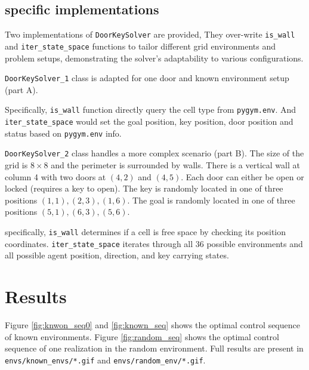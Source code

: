 \documentclass[conference]{IEEEtran}
\begin{document}
\subsection{specific implementations}
Two implementations of \texttt{DoorKeySolver} are provided, 
They over-write \texttt{is\_wall} and \texttt{iter\_state\_space} functions
to tailor different grid environments and problem setups, 
demonstrating the solver's adaptability to various configurations. 

\texttt{DoorKeySolver\_1} class 
is adapted for one door and known environment setup (part A).

Specifically, \texttt{is\_wall} function directly query the cell type from \texttt{pygym.env}.
And \texttt{iter\_state\_space} would set the goal position, key position, door position and status
based on \texttt{pygym.env} info.

\texttt{DoorKeySolver\_2} class handles a more complex scenario (part B).
The size of the grid is $8 \times 8$ and the perimeter is surrounded by walls. 
There is a vertical wall at column 4 with two doors at $(4, 2)$ and $(4, 5)$. 
Each door can either be open or locked (requires a key to open). 
The key is randomly located in one of three positions ${(1, 1), (2, 3), (1, 6)}$.
The goal is randomly located in one of three positions ${(5, 1), (6, 3), (5, 6)}$.

specifically, \texttt{is\_wall} determines if a cell is free space by checking its position coordinates.
\texttt{iter\_state\_space} iterates through all 36 possible environments
and all possible agent position, direction, and key carrying states.

\section{Results}
Figure \ref{fig:knwon_seq0} and \ref{fig:known_seq} shows the optimal control sequence of known environments.
Figure \ref{fig:random_seq} shows the optimal control sequence of one realization in the random environment.
Full results are present in \texttt{envs/known\_envs/*.gif} and \texttt{envs/random\_env/*.gif}.
\end{document}
